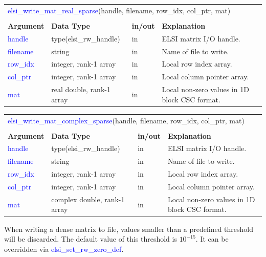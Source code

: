 \documentclass{report}
\newcommand{\tcb}[1]{\textcolor{blue}{#1}}
\begin{document}
\begin{tabular}[]{|p{20mm}|p{45mm}|p{15mm}|p{85mm}|}
\multicolumn{4}{l}{\tcb{elsi\_write\_mat\_real\_sparse}(handle, filename, row\_idx, col\_ptr, mat)}\\
\multicolumn{4}{l}{}\\
\hline
\multicolumn{1}{|l|}{\textbf{Argument}} & \multicolumn{1}{l|}{\textbf{Data Type}} & \multicolumn{1}{l|}{\textbf{in/out}} & \multicolumn{1}{l|}{\textbf{Explanation}}\\
\hline
\tcb{handle}   & type(elsi\_rw\_handle)    & in & ELSI matrix I/O handle.\\
\hline
\tcb{filename} & string                    & in & Name of file to write.\\
\hline
\tcb{row\_idx} & integer, rank-1 array     & in & Local row index array.\\
\hline
\tcb{col\_ptr} & integer, rank-1 array     & in & Local column pointer array.\\
\hline
\tcb{mat}      & real double, rank-1 array & in & Local non-zero values in 1D block CSC format.\\
\hline
\end{tabular}

\begin{tabular}[]{|p{20mm}|p{45mm}|p{15mm}|p{85mm}|}
\multicolumn{4}{l}{\tcb{elsi\_write\_mat\_complex\_sparse}(handle, filename, row\_idx, col\_ptr, mat)}\\
\multicolumn{4}{l}{}\\
\hline
\multicolumn{1}{|l|}{\textbf{Argument}} & \multicolumn{1}{l|}{\textbf{Data Type}} & \multicolumn{1}{l|}{\textbf{in/out}} & \multicolumn{1}{l|}{\textbf{Explanation}}\\
\hline
\tcb{handle}   & type(elsi\_rw\_handle)       & in & ELSI matrix I/O handle.\\
\hline
\tcb{filename} & string                       & in & Name of file to write.\\
\hline
\tcb{row\_idx} & integer, rank-1 array        & in & Local row index array.\\
\hline
\tcb{col\_ptr} & integer, rank-1 array        & in & Local column pointer array.\\
\hline
\tcb{mat}      & complex double, rank-1 array & in & Local non-zero values in 1D block CSC format.\\
\hline
\end{tabular}

When writing a dense matrix to file, values smaller than a predefined threshold will be discarded. The default value of this threshold is $10^{-15}$. It can be overridden via \tcb{elsi\_set\_rw\_zero\_def}.
\end{document}
